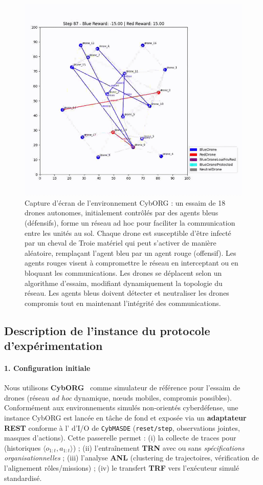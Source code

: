 \begin{figure}[h!]
    \centering
    \includegraphics[trim=0cm 1cm 0cm 1cm, clip, width=0.6\linewidth]{figures/cyborg.png}
    \caption[Capture d'écran de l'environnement CybORG]{Capture d'écran de l'environnement CybORG : un essaim de 18 drones autonomes, initialement contrôlés par des agents bleus (défensifs), forme un réseau ad hoc pour faciliter la communication entre les unités au sol. Chaque drone est susceptible d'être infecté par un cheval de Troie matériel qui peut s'activer de manière aléatoire, remplaçant l'agent bleu par un agent rouge (offensif). Les agents rouges visent à compromettre le réseau en interceptant ou en bloquant les communications. Les drones se déplacent selon un algorithme d'essaim, modifiant dynamiquement la topologie du réseau. Les agents bleus doivent détecter et neutraliser les drones compromis tout en maintenant l'intégrité des communications.}
    \label{fig:cyborg}
\end{figure}

\subsection{Description de l'instance du protocole d'expérimentation}

\paragraph{1. Configuration initiale}

Nous utilisons \textbf{CybORG}~\cite{Standen2021} comme simulateur de référence pour l'essaim de drones (réseau \textit{ad hoc} dynamique, nœuds mobiles, compromis possibles). Conformément aux environnements simulés non-orientés cyberdéfense, une instance CybORG est lancée en tâche de fond et exposée via un \textbf{adaptateur REST} conforme à l’ d’I/O de \texttt{CybMASDE} (\texttt{reset/step}, observations jointes, masques d’actions). Cette passerelle permet : (i) la collecte de traces pour \texttt{} (historiques $\langle o_{1:t}, a_{1:t} \rangle$) ; (ii) l’entraînement  \textbf{TRN} avec ou sans \textit{spécifications organisationnelles} ; (iii) l’analyse \textbf{ANL} (clustering de trajectoires, vérification de l’alignement rôles/missions) ; (iv) le transfert \textbf{TRF} vers l’exécuteur simulé standardisé.

